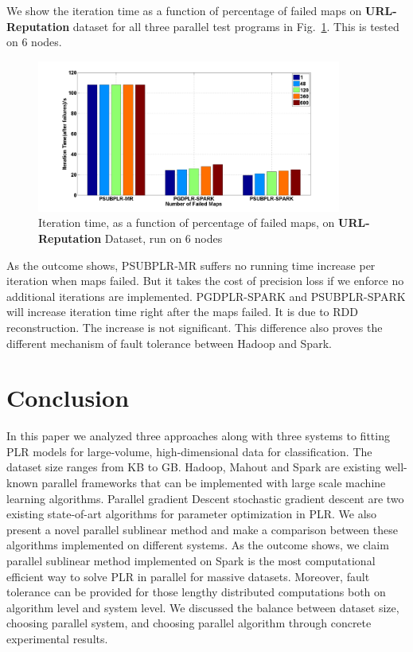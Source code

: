 \documentclass{llncs}
\begin{document}
We show the iteration time as a function of percentage of failed maps on \textbf{URL-Reputation} dataset for all three parallel test programs in Fig.~\ref{fig:14}.
This is tested on 6 nodes.
\begin{figure}[tb] \label{fig:14}
\center \includegraphics[height=5cm,width=10cm]{img/fault_tolerance.png}
\caption{Iteration time, as a function of percentage of failed maps, on \textbf{URL-Reputation} Dataset, run on 6 nodes}
\end{figure}
As the outcome shows, PSUBPLR-MR suffers no running time increase per iteration when maps failed. But it takes the cost of precision loss if we enforce no additional iterations are implemented.
PGDPLR-SPARK and PSUBPLR-SPARK will increase iteration time right after the maps failed. It is due to RDD reconstruction. The increase is not significant.
This difference also proves the different mechanism of fault tolerance between Hadoop and Spark.

\section{Conclusion} \label{sec:concl}
In this paper we analyzed three approaches along with three systems to fitting PLR models for large-volume, high-dimensional data for classification.
The dataset size ranges from KB to GB.
Hadoop, Mahout and Spark are existing well-known parallel frameworks that can be implemented with large scale machine learning algorithms.
Parallel gradient Descent stochastic gradient descent are two existing state-of-art algorithms for parameter optimization in PLR.
We also present a novel parallel sublinear method and make a comparison between these algorithms implemented on different systems.
As the outcome shows, we claim parallel sublinear method implemented on Spark is the most computational efficient way to solve PLR in parallel for massive datasets.
Moreover, fault tolerance can be provided for those lengthy distributed computations both on algorithm level and system level.
We discussed the balance between dataset size, choosing parallel system, and choosing parallel algorithm through concrete experimental results.

\begin{small}


\end{small}
\end{document}
